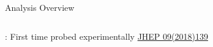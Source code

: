 \documentclass[aspectratio=169,xcolor=table]{beamer}
\makeatletter
\newcommand{\specialcell}[2][l]{%
  \begin{tabular}[#1]{@{}l@{}}#2\end{tabular}}
\makeatother
\begin{document}
\begin{frame}[t]{Analysis Overview}
\begin{columns}[t]

          \tiny *: First time probed experimentally \textcolor{blue}{\href{https://link.springer.com/article/10.1007/JHEP09(2018)139}{JHEP 09(2018)139}}


\end{columns}
\end{frame}
\end{document}
